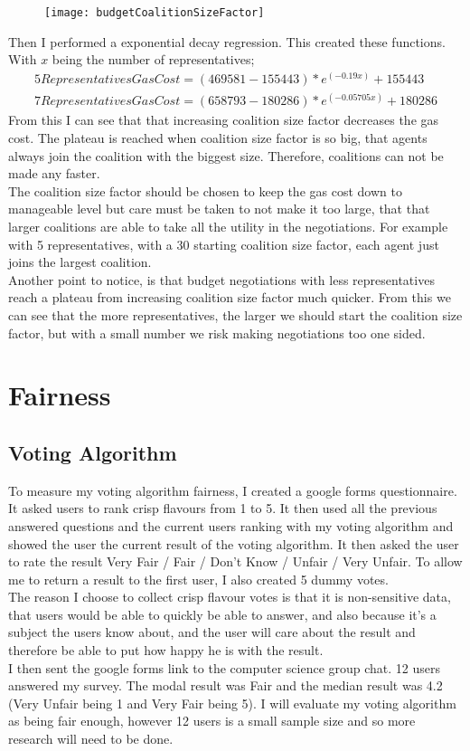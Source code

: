 \begin{figure}[H]
\texttt{[image: budgetCoalitionSizeFactor]}
\end{figure}
Then I performed a exponential decay regression. This created these functions. With $x$ being the number of representatives;
\begin{gather*}
5 Representatives Gas Cost = (469581 - 155443)*e^{(-0.19x)} + 155443 \\
7 Representatives Gas Cost = (658793 - 180286)*e^{(-0.05705x)} + 180286
\end{gather*}
From this I can see that that increasing coalition size factor decreases the gas cost. The plateau is reached when coalition size factor is so big, that agents always join the coalition with the biggest size. Therefore, coalitions can not be made any faster. \\
The coalition size factor should be chosen to keep the gas cost down to manageable level but care must be taken to not make it too large, that that larger coalitions are able to take all the utility in the negotiations. For example with 5 representatives, with a 30 starting coalition size factor, each agent just joins the largest coalition. \\
Another point to notice, is that budget negotiations with less representatives reach a plateau from increasing coalition size factor much quicker.  From this we can see that the more representatives, the larger we should start the coalition size factor, but with a small number we risk making negotiations too one sided.\\
\section{Fairness} 
\subsection{Voting Algorithm}
To measure my voting algorithm fairness, I created a google forms questionnaire. It asked users to rank crisp flavours from 1 to 5. It then used all the previous answered questions and the current users ranking with my voting algorithm and showed the user the current result of the voting algorithm. It then asked the user to rate the result Very Fair / Fair / Don’t Know / Unfair / Very Unfair. To allow me to return a result to the first user, I also created 5 dummy votes. \\
The reason I choose to collect crisp flavour votes is that it is non-sensitive data, that users would be able to quickly be able to answer, and also because it’s a subject the users know about, and the user will care about the result and therefore be able to put how happy he is with the result. \\
I then sent the google forms link to the computer science group chat. 12 users answered my survey. The modal result was Fair and the median result was 4.2 (Very Unfair being 1 and Very Fair being 5). I will evaluate my voting algorithm as being fair enough, however 12 users is a small sample size and so more research will need to be done.

